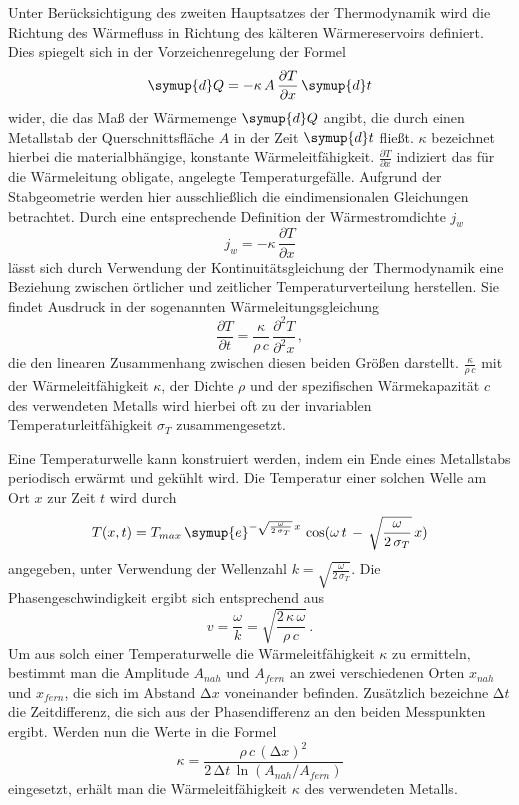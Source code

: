Unter Berücksichtigung des zweiten Hauptsatzes der Thermodynamik wird die Richtung des Wärmefluss in Richtung des 
kälteren Wärmereservoirs definiert. 
Dies spiegelt sich in der Vorzeichenregelung der Formel 
\begin{equation}
    \symup{d}Q = - \kappa \, A \, \frac{\partial T}{\partial x} \, \symup{d}t 
    \label{eqn:waermestrom}
\end{equation}
wider, die das Maß der Wärmemenge $\symup{d}Q$ angibt, die durch einen Metallstab der Querschnittsfläche $A$ in der Zeit 
$\symup{d}t$ fließt. 
$\kappa$ bezeichnet hierbei die materialbhängige, konstante Wärmeleitfähigkeit. 
$\frac{\partial T}{\partial x}$ indiziert das für die Wärmeleitung obligate, angelegte Temperaturgefälle.
Aufgrund der Stabgeometrie werden hier ausschließlich die eindimensionalen Gleichungen betrachtet.
Durch eine entsprechende Definition der Wärmestromdichte $j_w$
\begin{equation}
    j_w = - \kappa \, \frac{\partial T}{\partial x}
\end{equation}
lässt sich durch Verwendung der Kontinuitätsgleichung der Thermodynamik eine Beziehung zwischen örtlicher und zeitlicher 
Temperaturverteilung herstellen. 
Sie findet Ausdruck in der sogenannten Wärmeleitungsgleichung 
\begin{equation}
    \frac{\partial T}{\partial t} = \frac{\kappa}{\rho \, c} \, \frac{\partial^2 T}{\partial^2 x} \, ,
\end{equation}
die den linearen Zusammenhang zwischen diesen beiden Größen darstellt. 
$\frac{\kappa}{\rho \, c}$ mit der Wärmeleitfähigkeit $\kappa$, der Dichte $\rho$ und der spezifischen Wärmekapazität $c$ 
des verwendeten Metalls wird hierbei oft zu der invariablen Temperaturleitfähigkeit $\sigma_T$ zusammengesetzt. 

Eine Temperaturwelle kann konstruiert werden, indem ein Ende eines Metallstabs periodisch erwärmt und gekühlt wird. 
Die Temperatur einer solchen Welle am Ort $x$ zur Zeit $t$ wird durch
\begin{equation}
    T(x,t) = T_{max} \, \symup{e}^{- \sqrt{\frac{\omega}{2 \, \sigma_T}} \, x} \, \cos(\omega \, t \, - \, \sqrt{\frac{\omega}{2 \, \sigma_T}} \, x )
\end{equation}
angegeben, unter Verwendung der Wellenzahl $k = \sqrt{\frac{\omega}{2 \, \sigma_T}}$. 
Die Phasengeschwindigkeit ergibt sich entsprechend aus 
\begin{equation}
    v = \frac{\omega}{k} = \sqrt{\frac{2 \, \kappa \, \omega}{\rho \, c}} \, .
\end{equation}
Um aus solch einer Temperaturwelle die Wärmeleitfähigkeit $\kappa$ zu ermitteln, bestimmt man die Amplitude 
$A_{nah}$ und $A_{fern}$ an zwei verschiedenen Orten $x_{nah}$ und $x_{fern}$, die sich im Abstand $\increment x$ 
voneinander befinden. Zusätzlich bezeichne $\increment t$ die Zeitdifferenz, die sich aus der Phasendifferenz 
an den beiden Messpunkten ergibt. 
Werden nun die Werte in die Formel 
\begin{equation}
    \kappa = \frac{\rho \, c \, (\increment x)^2}{2 \, \increment t \, \ln(A_{nah} / A_{fern})}
    \label{eqn:kappa}
\end{equation}
eingesetzt, erhält man die Wärmeleitfähigkeit $\kappa$ des verwendeten Metalls. 
